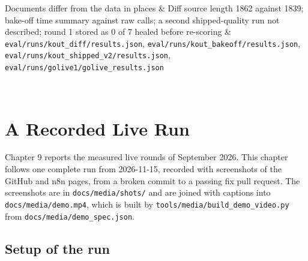\begin{longtable}
Documents differ from the data in places & Diff source length 1862 against 1839; bake-off time summary against raw calls; a second shipped-quality run not described; round 1 stored as 0 of 7 healed before re-scoring & \texttt{eval/\allowbreak{}runs/\allowbreak{}kout\_\allowbreak{}diff/\allowbreak{}results.\allowbreak{}json}, \texttt{eval/\allowbreak{}runs/\allowbreak{}kout\_\allowbreak{}bakeoff/\allowbreak{}results.\allowbreak{}json}, \texttt{eval/\allowbreak{}runs/\allowbreak{}kout\_\allowbreak{}shipped\_\allowbreak{}v2/\allowbreak{}results.\allowbreak{}json}, \texttt{eval/\allowbreak{}runs/\allowbreak{}golive1/\allowbreak{}golive\_\allowbreak{}results.\allowbreak{}json} \\
\bottomrule
\caption{Limits of the evaluation}\label{tab:09-10}\\
\end{longtable}
\endgroup

\section{A Recorded Live Run}

Chapter 9 reports the measured live rounds of September 2026. This chapter follows one complete run from 2026-11-15, recorded with screenshots of the GitHub and n8n pages, from a broken commit to a passing fix pull request. The screenshots are in \texttt{docs/\allowbreak{}media/\allowbreak{}shots/\allowbreak{}} and are joined with captions into \texttt{docs/\allowbreak{}media/\allowbreak{}demo.\allowbreak{}mp4}, which is built by \texttt{tools/\allowbreak{}media/\allowbreak{}build\_\allowbreak{}demo\_\allowbreak{}video.\allowbreak{}py} from \texttt{docs/\allowbreak{}media/\allowbreak{}demo\_\allowbreak{}spec.\allowbreak{}json}.

\subsection{Setup of the run}

